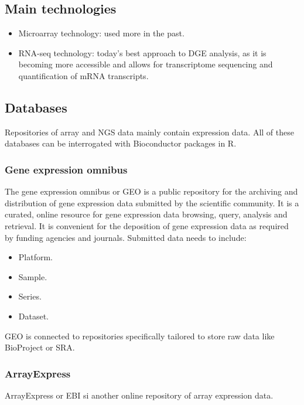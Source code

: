 		\subsection{Main technologies}
		\begin{itemize}
		\item Microarray technology: used more in the past.
		\item RNA-seq technology: today's best approach to DGE analysis, as it is becoming more accessible and allows for transcriptome sequencing and quantification of mRNA transcripts.
		\end{itemize}

	\subsection{Databases}
	Repositories of array and NGS data mainly contain expression data.
	All of these databases can be interrogated with Bioconductor packages in R.

		\subsubsection{Gene expression omnibus}
		The gene expression omnibus or GEO is a public repository for the archiving and distribution of gene expression data submitted by the scientific community.
		It is a curated, online resource for gene expression data browsing, query, analysis and retrieval.
		It is convenient for the deposition of gene expression data as required by funding agencies and journals.
		Submitted data needs to include:

		\begin{multicols}{4}
			\begin{itemize}
				\item Platform.
				\item Sample.
				\item Series.
				\item Dataset.
			\end{itemize}
		\end{multicols}

		GEO is connected to repositories specifically tailored to store raw data like BioProject or SRA.

		\subsubsection{ArrayExpress}
		ArrayExpress or EBI si another online repository of array expression data.

